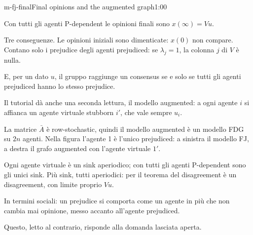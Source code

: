 \begin{slide}{m-fj-final}{Final opinions and the augmented graph}{1:00}
  \begin{discorso}
    \item Con tutti gli agenti P-dependent le opinioni finali sono $x(\infty)=Vu$.
    \item Tre conseguenze. Le opinioni iniziali sono dimenticate: $x(0)$ non compare. Contano solo i {\color{red}} {\color{blue}prejudice} degli agenti prejudiced: se $\lambda_j=1$, la colonna $j$ di $V$ è nulla.
    \item E, per un dato $u$, il gruppo raggiunge un {\color{red}} {\color{blue}consensus} se e solo se tutti gli agenti prejudiced hanno lo stesso {\color{red}} {\color{blue}prejudice.}
    \item Il tutorial dà anche una seconda lettura, il modello {\color{red}} {\color{blue}augmented:} a ogni agente $i$ si affianca un agente virtuale stubborn $i'$, che vale sempre $u_i$.
    \item La matrice $\bar A$ è row-stochastic, quindi {\color{blue}il modello augmented} è un modello FDG su $2n$ agenti. Nella figura l'agente 1 è l'unico prejudiced: a sinistra il modello FJ, a destra il grafo {\color{red}} {\color{blue}augmented} con l'agente virtuale $1'$.
    \item Ogni agente virtuale è un sink aperiodico; con tutti gli agenti P-dependent sono gli unici sink. {\color{red}    } {\color{blue}Più sink, tutti aperiodici: per il teorema del disagreement} è {\color{red}       } {\color{blue}un disagreement,} con limite proprio $Vu$.
    \item In termini sociali: un {\color{red}} {\color{blue}prejudice} si comporta come un agente in più che non cambia mai opinione, messo accanto all'agente prejudiced.
    \item {\color{blue}Questo, letto al contrario, risponde alla domanda lasciata aperta.}
    \item {\color{red}     }
  \end{discorso}
\end{slide}

